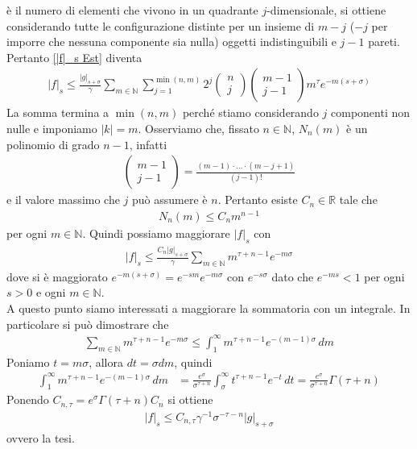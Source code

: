 \documentclass[twoside, 11pt]{amsbook}
\makeatletter
\newcommand{\0}{{(0)}}
\newcommand{\3}{{(3)}}
\theoremstyle{colonplain}
\theoremstyle{colondefinition}
\theoremstyle{colonremark}
\numberwithin{equation}{chapter}
\renewcommand{\proofname}{Dimostrazione}
\renewenvironment{proof}[1][\proofname]{\par
  \pushQED{\qed}%
  \normalfont \topsep6\p@\@plus6\p@\relax
  \trivlist
  \item[\hskip\labelsep\bfseries #1:]\ignorespaces
}{%
  \popQED\endtrivlist\@endpefalse
}
\makeatother
\begin{document}
\begin{proof}
è il numero di elementi che vivono in un quadrante $j$-dimensionale, si ottiene considerando tutte le configurazione distinte per un insieme di $m - j$ ($-j$ per imporre che nessuna componente sia nulla) oggetti indistinguibili e $j - 1$ pareti. Pertanto \eqref{|f|_s Est} diventa
\begin{align}
    |f|_s \leq \frac{|g|_{s + \sigma}}{\gamma} \sum_{m \in \mathbb{N}}\sum_{j = 1}^{\min(n, m)} 2^j\begin{pmatrix}
        n \\
        j
    \end{pmatrix} \begin{pmatrix}
        m - 1 \\
        j - 1
    \end{pmatrix} m^\tau e^{-m(s + \sigma)}
\end{align}
La somma termina a $\min(n, m)$ perché stiamo considerando $j$ componenti non nulle e imponiamo $|k| = m$. Osserviamo che, fissato $n \in \mathbb{N}$, $N_n(m)$ è un polinomio di grado $n - 1$, infatti
\begin{align}
    \begin{pmatrix}
        m - 1 \\
        j - 1
    \end{pmatrix} = \frac{(m - 1)\cdot \dots \cdot(m - j + 1)}{(j - 1)!}
\end{align}
e il valore massimo che $j$ può assumere è $n$. Pertanto esiste $C_n \in \mathbb{R}$ tale che
\begin{align}
    N_n(m) \leq C_n m^{n - 1}
\end{align}
per ogni $m \in \mathbb{N}$. Quindi possiamo maggiorare $|f|_s$ con
\begin{align}
    |f|_s \leq \frac{C_n |g|_{s + \sigma}}{\gamma}\sum_{m \in \mathbb{N}} m^{\tau + n - 1}e^{-m\sigma}
\end{align}
dove si è maggiorato $e^{-m(s + \sigma)} = e^{-sm}e^{-m\sigma}$ con $e^{-s\sigma}$ dato che $e^{-ms} < 1$ per ogni $s > 0$ e ogni $m \in \mathbb{N}$. \\
A questo punto siamo interessati a maggiorare la sommatoria con un integrale. In particolare si può dimostrare che
\begin{align}
    \sum_{m \in \mathbb{N}} m^{\tau + n - 1}e^{-m\sigma} \leq \int_1^\infty m^{\tau + n - 1}e^{-(m - 1)\sigma} \, dm
\end{align}
Poniamo $t = m\sigma$, allora $dt = \sigma dm$, quindi
\begin{align}
    \int_1^\infty m^{\tau + n - 1}e^{-(m - 1)\sigma} \, dm &= \frac{e^\sigma}{\sigma^{\tau + n}}\int_\sigma^\infty t^{\tau + n - 1}e^{-t} \, dt = \frac{e^\sigma}{\sigma^{\tau + n}}\Gamma(\tau + n)
\end{align}
Ponendo $C_{n, \tau} = e^\sigma\Gamma(\tau + n)C_n$ si ottiene
\begin{align}
    |f|_s \leq C_{n, \tau}\gamma^{-1}\sigma^{-\tau - n}|g|_{s + \sigma}
\end{align}
ovvero la tesi.
\end{proof}
\end{document}
